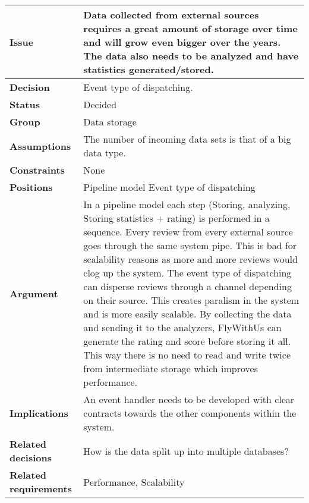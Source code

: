 
\label{dd:large-data}
\begin{tabular}{ l  p{10cm}}
\hline
\bf Issue & Data collected from external sources requires a great amount of storage over time and will grow even bigger over the years. The data also needs to be analyzed and have statistics generated/stored.\\
\hline
\bf Decision & Event type of dispatching.\\
\hline
\bf Status & Decided\\
\hline
\bf Group & Data storage \\
\hline
\bf Assumptions & The number of incoming data sets is that of a big data type.  \\
\hline
\bf Constraints & None \\
\hline
\bf Positions & Pipeline model \newline\newline
Event type of dispatching
 \\
\hline
\bf Argument & In a pipeline model each step (Storing, analyzing, Storing statistics + rating) is performed in a sequence. Every review from every external source goes through the same system pipe. This is bad for scalability reasons as more and more reviews would clog up the system. The event type of dispatching can disperse reviews through a channel depending on their source. This creates paralism in the system and is more easily scalable. By collecting the data and sending it to the analyzers, FlyWithUs can generate the rating and score before storing it all. This way there is no need to read and write twice from intermediate storage which improves performance. \\
\hline
\bf Implications & An event handler needs to be developed with clear contracts towards the other components within the system.  \\
\hline
\bf Related decisions & How is the data split up into multiple databases? \\
\hline
\bf Related requirements  & Performance, Scalability \\
\hline
\end{tabular}

